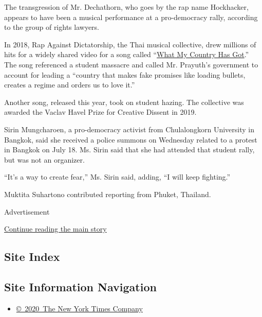 The transgression of Mr. Dechathorn, who goes by the rap name
Hockhacker, appears to have been a musical performance at a
pro-democracy rally, according to the group of rights lawyers.

In 2018, Rap Against Dictatorship, the Thai musical collective, drew
millions of hits for a widely shared video for a song called
``\href{https://www.youtube.com/watch?v=VZvzvLiGUtw}{What My Country Has
Got}.'' The song referenced a student massacre and called Mr. Prayuth's
government to account for leading a ``country that makes fake promises
like loading bullets, creates a regime and orders us to love it.''

Another song, released this year, took on student hazing. The collective
was awarded the Vaclav Havel Prize for Creative Dissent in 2019.

Sirin Mungcharoen, a pro-democracy activist from Chulalongkorn
University in Bangkok, said she received a police summons on Wednesday
related to a protest in Bangkok on July 18. Ms. Sirin said that she had
attended that student rally, but was not an organizer.

``It's a way to create fear,'' Ms. Sirin said, adding, ``I will keep
fighting.''

Muktita Suhartono contributed reporting from Phuket, Thailand.

Advertisement

\protect\hyperlink{after-bottom}{Continue reading the main story}

\hypertarget{site-index}{%
\subsection{Site Index}\label{site-index}}

\hypertarget{site-information-navigation}{%
\subsection{Site Information
Navigation}\label{site-information-navigation}}

\begin{itemize}
\tightlist
\item
  \href{https://help.nytimes3xbfgragh.onion/hc/en-us/articles/115014792127-Copyright-notice}{©~2020~The
  New York Times Company}
\end{itemize}

